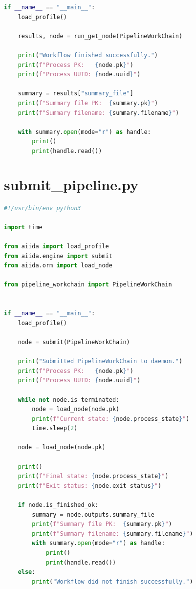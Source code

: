 \begin{lstlisting}[language=Python,
                   caption={pipeline\_workchain.py: Vollständige WorkChain-Implementierung (AiiDA)},
                   label={lst:app:aiida:workchain}]
if __name__ == "__main__":
    load_profile()

    results, node = run_get_node(PipelineWorkChain)

    print("Workflow finished successfully.")
    print(f"Process PK:   {node.pk}")
    print(f"Process UUID: {node.uuid}")

    summary = results["summary_file"]
    print(f"Summary file PK:  {summary.pk}")
    print(f"Summary filename: {summary.filename}")

    with summary.open(mode="r") as handle:
        print()
        print(handle.read())
\end{lstlisting}

\section{submit\_pipeline.py}
\label{app:aiida:submit}

\begin{lstlisting}[language=Python,
                   caption={submit\_pipeline.py: Workflow-Starter fuer den Daemon-Lauf (AiiDA)},
                   label={lst:app:aiida:submit}]
#!/usr/bin/env python3

import time

from aiida import load_profile
from aiida.engine import submit
from aiida.orm import load_node

from pipeline_workchain import PipelineWorkChain


if __name__ == "__main__":
    load_profile()

    node = submit(PipelineWorkChain)

    print("Submitted PipelineWorkChain to daemon.")
    print(f"Process PK:   {node.pk}")
    print(f"Process UUID: {node.uuid}")

    while not node.is_terminated:
        node = load_node(node.pk)
        print(f"Current state: {node.process_state}")
        time.sleep(2)

    node = load_node(node.pk)

    print()
    print(f"Final state: {node.process_state}")
    print(f"Exit status: {node.exit_status}")

    if node.is_finished_ok:
        summary = node.outputs.summary_file
        print(f"Summary file PK:  {summary.pk}")
        print(f"Summary filename: {summary.filename}")
        with summary.open(mode="r") as handle:
            print()
            print(handle.read())
    else:
        print("Workflow did not finish successfully.")
\end{lstlisting}

